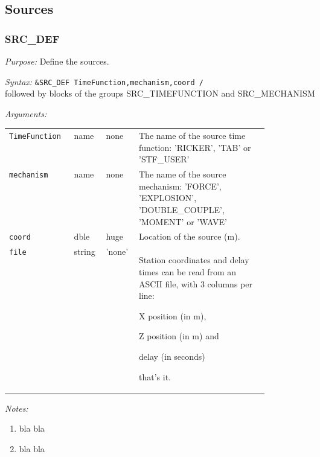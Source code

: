\renewcommand\arraystretch{1.5}%

\newenvironment{my_enumerate}{
\begin{enumerate}
  \setlength{\itemsep}{1pt}
  \setlength{\parskip}{0pt}
  \setlength{\parsep}{0pt}}{\end{enumerate}
}

\subsection{Sources}

\subsubsection{SRC\_DEF}
{\it Purpose:} Define the sources.

{\it Syntax:} \texttt{\&SRC\_DEF   TimeFunction,mechanism,coord /}\\
followed by blocks of the groups SRC\_TIMEFUNCTION and SRC\_MECHANISM 

{\it Arguments:}

\begin{tabular}[t]{lllp{0.5\linewidth}}
\texttt{TimeFunction} &  name& none& The name of the source time function: 'RICKER', 'TAB' or 'STF\_USER' \\
\texttt{mechanism} & name & none & The name of the source mechanism: 'FORCE', 'EXPLOSION', 'DOUBLE\_COUPLE', 'MOMENT' or 'WAVE' \\
\texttt{coord}  & dble & huge & Location of the source (m). \\
\texttt{file}  & string & 'none' & 
Station coordinates and delay times can
be read from an ASCII file, with 3 columns per line:
\begin{my_enumerate}
  \item X position (in m),
  \item Z position (in m) and
  \item delay (in seconds) 
\end{my_enumerate}
that's it.
\end{tabular}

{\it Notes:}
\begin{enumerate}
  \item bla bla 
  \item bla bla
\end{enumerate}

